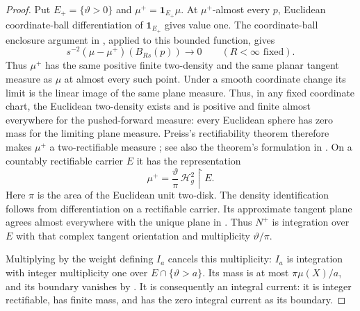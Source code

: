 \begin{proof}
Put \(E_+=\{\vartheta>0\}\) and \(\mu^+=\mathbf1_{E_+}\mu\).
At \(\mu^+\)-almost every \(p\), Euclidean coordinate-ball
differentiation of \(\mathbf1_{E_+}\) gives value one. The
coordinate-ball enclosure argument in
, applied to this bounded function,
gives
\[
 s^{-2}(\mu-\mu^+)(B_{Rs}(p))\longrightarrow0
 \qquad(R<\infty\text{ fixed}).
\]
Thus \(\mu^+\) has the same positive finite two-density and the same
planar tangent measure as \(\mu\) at almost every such point.
Under a smooth coordinate change its limit is the
linear image of the same plane measure.  Thus, in any fixed coordinate
chart, the Euclidean two-density exists and is positive and finite
almost everywhere for the pushed-forward measure: every Euclidean
sphere has zero mass for the limiting plane measure. Preiss's
rectifiability theorem therefore makes \(\mu^+\) a two-rectifiable measure
\cite{Preiss1987}; see also the theorem's formulation in
\cite[p.~771, opening paragraph]{KenigPreissToro2009}.
On a countably rectifiable carrier \(E\) it has
the representation
\begin{equation}\label{eq:density-rectifiable-measure}
 \mu^+=\frac{\vartheta}{\pi}\,
                 \mathcal H_g^2\!\restriction E.
\end{equation}
Here \(\pi\) is the area of the Euclidean unit two-disk.  The density
identification follows from differentiation on a rectifiable
carrier.  Its approximate tangent plane agrees almost everywhere
with the unique plane in .
Thus \(N^+\) is integration over \(E\) with that complex tangent
orientation and multiplicity \(\vartheta/\pi\).

Multiplying by the weight defining \(I_a\) cancels this multiplicity:
\(I_a\) is integration with integer multiplicity one over
\(E\cap\{\vartheta>a\}\).  Its mass is at most
\(\pi\mu(X)/a\), and its boundary vanishes by
.  It is consequently an integral current:
it is integer rectifiable, has finite mass, and has the zero integral
current as its boundary.


\end{proof}
